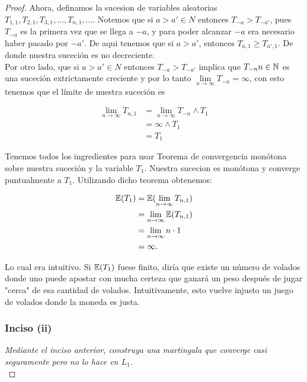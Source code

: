 \begin{proof}
		Ahora, definamos la sucesion de variables aleatorias ${T_{1,1}, T_{2,1}, T_{3,1}, \dots, T_{n,1}, 
		\dots}$. Notemos que si ${a>a' \in N}$ entonces ${T_{-a} > T_{-a'}}$, pues ${T_{-a}}$ es la primera vez
		que se llega a ${-a}$, y para poder alcanzar ${-a}$ era necesario haber pasado por ${-a'}$.
		De aqui tenemos que si ${a>a'}$, entonces ${T_{a,1} \geq T_{a',1}}$. De donde nuestra suceción es 
		no decreciente.\\
		
		Por otro lado, que si ${a>a' \in N}$ entonces ${T_{-a} > T_{-a'}}$ implica que ${T_{-n} n \in \mathbb{N}}$ es 
		una suceción extrictamente creciente y por lo tanto 
		${\lim\limits_{n \rightarrow \infty} T_{-n} = \infty}$, con esto tenemos que el límite de nuestra 
		suceción es 
		
		\begin{align}		
			\lim_{n\rightarrow\infty} T_{n,1} 	&=	\lim_{n\rightarrow\infty} T_{-n} \wedge T_1 \\
												&=	\infty \wedge T_1 \\
												&=	T_1
		\end{align}

		Tenemos todos los ingredientes para usar Teorema de convergencia monótona sobre nuestra suceción
		y la variable ${T_1}$. Nuestra sucecion es monótona y converge puntualmente a ${T_1}$. Utilizando
		dicho teorema obtenemos:
		
		\begin{align}
			\mathbb{E}(T_1) 	&=		\mathbb{E}(\lim_{n\rightarrow\infty} T_{n,1}) \\ 
						&= 		\lim_{n\rightarrow\infty} \mathbb{E}(T_{n,1}) \\
						&=		\lim_{n\rightarrow\infty} n\cdot 1 \\
						&=		\infty.
		\end{align}
		
		Lo cual era intuitivo. Si ${\mathbb{E}(T_1)}$ fuese finito, diría que existe un número de volados donde
		uno puede apostar con mucha certeza que ganará un peso después de jugar "cerca" de esa cantidad
		de volados. Intuitivamente, esto vuelve injusto un juego de volados donde la moneda es
		justa.\\
		
	\subsubsection{Inciso (ii)}
	\emph
	{	
		Mediante el inciso anterior, construya una martingala que converge 
		casi seguramente pero no lo hace en ${L_1}$.\\
	}
		

\end{proof}
